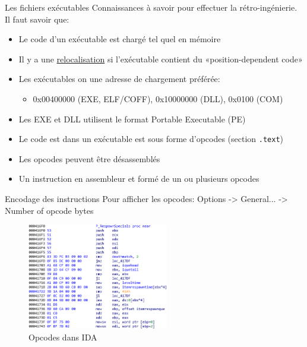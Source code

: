 \documentclass[10pt,xcolor={table,dvipsnames},t]{beamer}
\begin{document}
\begin{frame}{Les fichiers exécutables}
    Connaissances à savoir pour effectuer la rétro-ingénierie. Il faut savoir que:
    \begin{itemize}
        \item Le code d'un exécutable est chargé tel quel en mémoire
        \item Il y a une \href{https://en.wikipedia.org/wiki/Relocation_(computing)}{relocalisation} si l'exécutable contient du «position-dependent code»
        \item Les exécutables on une adresse de chargement préférée: 
        \begin{itemize}
            \item 0x00400000 (EXE, ELF/COFF), 0x10000000 (DLL), 0x0100 (COM)
        \end{itemize}
        \item Les EXE et DLL utilisent le format Portable Executable (PE) %
        \item Le code est dans un exécutable est sous forme d'opcodes (section \texttt{.text})
        \item Les opcodes peuvent être désassemblés
        \item Un instruction en assembleur et formé de un ou plusieurs opcodes
    \end{itemize}
\end{frame}

\begin{frame}{Encodage des instructions}
    Pour afficher les opcodes: Options -> General... -> Number of opcode bytes
    \begin{figure}
        \includegraphics[width=0.55\textwidth]{Opcodes}
        \caption{\label{fig:opcodes}Opcodes dans IDA}
    \end{figure}

\end{frame}
\end{document}
